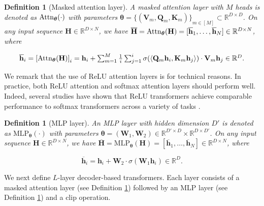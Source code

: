 \documentclass[10pt]{article}
\newtheorem{definition}[theorem]{Definition}
\renewcommand{\bar}{\overline}
\newcommand{\<}{\left\langle}
\renewcommand{\>}{\right\rangle}
\renewcommand{\bQ}{\mathbf{Q}}
\newcommand{\Attn}{{\rm Attn}}
\newcommand{\barsig}{\sigma}
\newcommand{\MLP}{\mathrm{MLP}}
\newcommand{\paren}[1]{{\left( #1 \right)}}
\newcommand{\brac}[1]{{\left[ #1 \right]}}
\newcommand{\sets}[1]{{\{ #1 \}}}
\newcommand{\R}{\mathbb{R}}
\def\bH{{\mathbf H}}
\def\bK{{\mathbf K}}
\def\bQ{{\mathbf Q}}
\def\bV{{\mathbf V}}
\def\bW{{\mathbf W}}
\def\btheta{{\boldsymbol \theta}}
\def\bh{{\mathbf h}}
\begin{document}
\begin{definition}[Masked attention layer]
\label{def:masked-attention}
A masked attention layer with $M$ heads is denoted as $\Attn_{\btheta}(\cdot)$ with parameters $\btheta=\sets{ (\bV_m,\bQ_m,\bK_m)}_{m\in[M]}\subset \R^{D\times D}$. On any input sequence $\bH\in\R^{D\times N}$, we have $\bar{\bH} = \Attn_{\btheta}(\bH) = [\bar{\bh}_1, \ldots, \bar{\bh}_N] \in \R^{D \times N}$, where















\begin{align*}
\textstyle    \bar{\bh}_i = \brac{\Attn_{\btheta}(\bH)}_i = \bh_i + \sum_{m=1}^M \frac{1}{i}\sum_{j=1}^i \barsig\paren{ \<\bQ_m\bh_i, \bK_m\bh_j\> }\cdot \bV_m\bh_j \in \R^D.
\end{align*}
\end{definition}

We remark that the use of ReLU attention layers is for technical reasons. In practice, both ReLU attention and softmax attention layers should perform well. Indeed, several studies have shown that ReLU transformers achieve comparable performance to softmax transformers  across a variety of tasks \citep{wortsman2023replacing, shen2023study, bai2023transformers}.

\begin{definition}[MLP layer]
\label{def:mlp}
An MLP layer with hidden dimension $D'$ is denoted as $\MLP_{\btheta}(\cdot)$ with parameters $\btheta=(\bW_1,\bW_2)\in\R^{D'\times D}\times\R^{D\times D'}$. On any input sequence $\bH\in\R^{D\times N}$, we have $\bar{\bH} = \MLP_{\btheta}(\bH) = [\bar{\bh}_1, \ldots, \bar{\bh}_N] \in \R^{D \times N}$, where





\[
\bar{\bh}_i=\bh_i+\bW_2 \cdot \sigma(\bW_1\bh_i) \in \R^D.
\]
\end{definition}
We next define $L$-layer decoder-based transformers. Each layer consists of a masked attention layer (see Definition \ref{def:masked-attention}) followed by an MLP layer (see Definition \ref{def:mlp}) and a clip operation.
\end{document}
